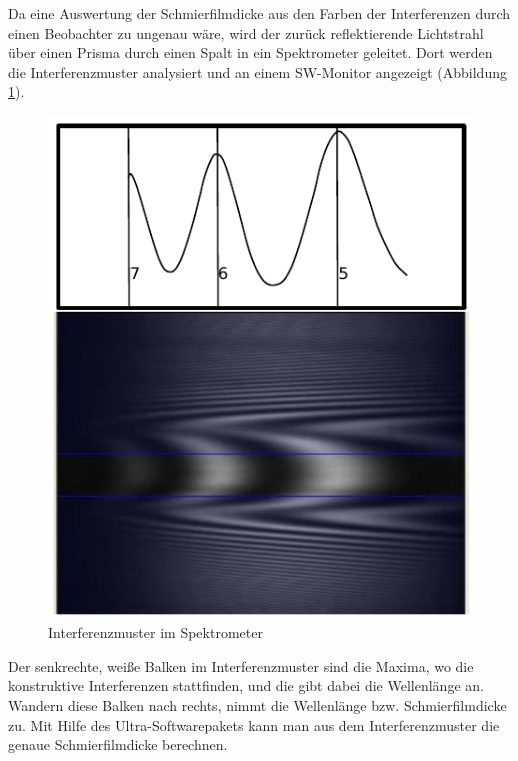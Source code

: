 Da eine Auswertung der Schmierfilmdicke aus den Farben der Interferenzen durch einen Beobachter zu ungenau wäre, wird der zurück reflektierende Lichtstrahl über einen Prisma durch einen Spalt in ein Spektrometer geleitet.
Dort werden die Interferenzmuster analysiert und an einem SW-Monitor angezeigt (Abbildung \ref{fig:ehl_interferenzmuster}).

\begin{figure}[htb]
    \centering
    \includegraphics[]{./images/interferenzsmuster.pdf}
    \caption{Interferenzmuster im Spektrometer \cite{ehl_broshure}}
    \label{fig:ehl_interferenzmuster}
\end{figure}
%
Der senkrechte, weiße Balken im Interferenzmuster sind die Maxima, wo die konstruktive Interferenzen stattfinden, und die gibt dabei die Wellenlänge an.
Wandern diese Balken nach rechts, nimmt die Wellenlänge bzw. Schmierfilmdicke zu.
Mit Hilfe des Ultra-Softwarepakets kann man aus dem Interferenzmuster die genaue Schmierfilmdicke berechnen.

